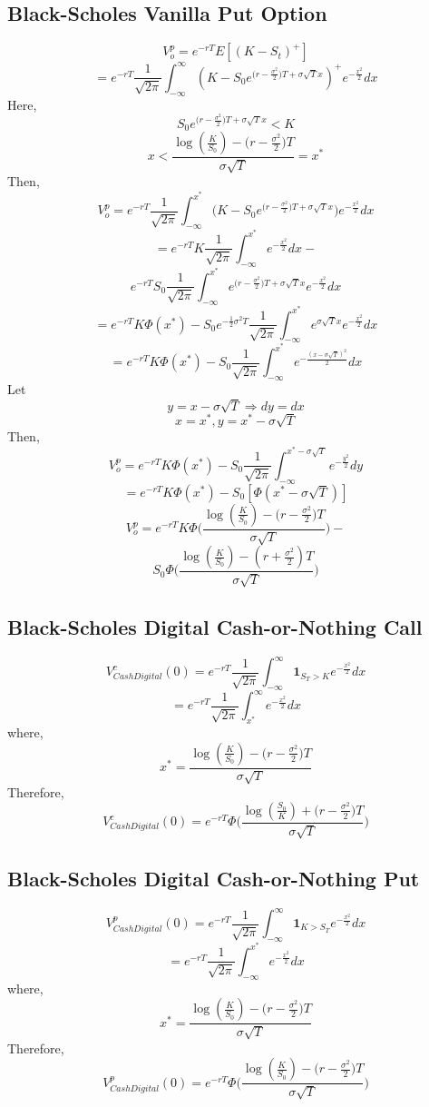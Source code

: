\documentclass[fleqn,12pt]{SelfArx}
\begin{document}
\subsection{Black-Scholes Vanilla Put Option}
$$
V_o^{p} = e^{-rT}{E}[(K-S_t)^{+}]
$$$$
= e^{-rT}\frac{1}{\sqrt{2\pi}}\int_{-\infty}^{\infty}(K-S_0e^{\big(r-\frac{\sigma^{2}}{2}\big)T +\sigma\sqrt{T}x})^{+}e^{-\frac{x^{2}}{2}}dx
$$
Here, 
$$S_0e^{\big(r-\frac{\sigma^{2}}{2}\big)T +\sigma\sqrt{T}x} < K$$
$$ 
x < \frac{\log({\frac{K}{S_0}})-\big(r-\frac{\sigma^{2}}{2}\big)T}{\sigma\sqrt{T}} = x^{*}
$$
Then,
$$
V_o^{p} = e^{-rT}\frac{1}{\sqrt{2\pi}}\int_{-\infty}^{x^{*}}\Big(K-S_0e^{\big(r-\frac{\sigma^{2}}{2}\big)T +\sigma\sqrt{T}x}\Big)e^{-\frac{x^{2}}{2}}dx
$$$$
= e^{-rT}K\frac{1}{\sqrt{2\pi}}\int_{-\infty}^{x^{*}}e^{-\frac{x^{2}}{2}}dx-
$$$$
e^{-rT}S_0\frac{1}{\sqrt{2\pi}}\int_{-\infty}^{x^{*}}e^{\big(r-\frac{\sigma^{2}}{2}\big)T+\sigma\sqrt{T}x}e^{-\frac{x^{2}}{2}}dx
$$$$
=e^{-rT}K\Phi(x^{*})-S_0e^{-\frac{1}{2}\sigma^{2}T}\frac{1}{\sqrt{2\pi}}\int_{-\infty}^{x^{*}}e^{\sigma\sqrt{T}x}e^{-\frac{x^{2}}{2}}dx
$$$$
=e^{-rT}K\Phi(x^{*})-S_0\frac{1}{\sqrt{2\pi}}\int_{-\infty}^{x^{*}}e^{-\frac{(x-\sigma\sqrt{T})^{2}}{2}}dx
$$
Let 
$$y = x-\sigma\sqrt{T} \Rightarrow dy=dx$$
$$x = x^{*}, y = x^{*}-\sigma\sqrt{T}$$
Then,
$$
V_o^{p} = e^{-rT}K\Phi(x^{*}) - S_0\frac{1}{\sqrt{2\pi}}\int_{-\infty}^{x^{*}-\sigma\sqrt{T}}e^{-\frac{y^{2}}{2}}dy
$$$$
= e^{-rT}K\Phi(x^{*}) - S_0[\Phi(x^{*}-\sigma\sqrt{T})]
$$$$
V_o^{p} = e^{-rT}K\Phi\Bigg(\frac{\log({\frac{K}{S_0}})-\big(r-\frac{\sigma^{2}}{2}\big)T}{\sigma\sqrt{T}}\Bigg) -
$$$$
S_0\Phi\Bigg(\frac{\log({\frac{K}{S_0}})-(r+\frac{\sigma^{2}}{2})T}{\sigma\sqrt{T}}\Bigg)
$$

\subsection{Black-Scholes Digital Cash-or-Nothing Call}
$$
V^{c}_{Cash Digital}(0) = e^{-rT}\frac{1}{\sqrt{2\pi}}\int_{-\infty}^{\infty}\mathbf{1}_{S_T>K}e^{-\frac{x^{2}}{2}}dx
$$
$$
= e^{-rT}\frac{1}{\sqrt{2\pi}}\int_{x^{*}}^{\infty}e^{-\frac{x^{2}}{2}}dx
$$
where,
$$
x^{*} = \frac{\log({\frac{K}{S_0}})-\big(r-\frac{\sigma^{2}}{2}\big)T}{\sigma\sqrt{T}} 
$$
Therefore,
$$
V^{c}_{Cash Digital}(0) = e^{-rT}\Phi\Bigg(\frac{\log({\frac{S_0}{K}})+\big(r-\frac{\sigma^{2}}{2}\big)T}{\sigma\sqrt{T}} \Bigg)
$$

\subsection{Black-Scholes Digital Cash-or-Nothing Put}
$$
V^{p}_{Cash Digital}(0) = e^{-rT}\frac{1}{\sqrt{2\pi}}\int_{-\infty}^{\infty}\mathbf{1}_{K>S_T}e^{-\frac{x^{2}}{2}}dx
$$
$$
= e^{-rT}\frac{1}{\sqrt{2\pi}}\int_{-\infty}^{x^{*}}e^{-\frac{x^{2}}{2}}dx
$$
where,
$$
x^{*} = \frac{\log({\frac{K}{S_0}})-\big(r-\frac{\sigma^{2}}{2}\big)T}{\sigma\sqrt{T}} 
$$
Therefore,
$$
V^{p}_{Cash Digital}(0) = e^{-rT}\Phi\Bigg(\frac{\log({\frac{K}{S_0}})-\big(r-\frac{\sigma^{2}}{2}\big)T}{\sigma\sqrt{T}} \Bigg)
$$
\end{document}
